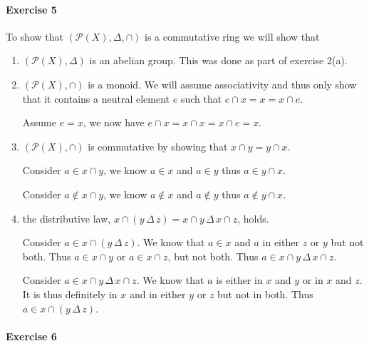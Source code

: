 \documentclass{article}
\newcommand{\Deltaop}{\, \Delta\, }
\begin{document}
\pagebreak
\paragraph{Exercise 5}

To show that $(\mathcal{P}(X), \Delta, \cap)$ is a commutative ring we will show that
\begin{enumerate}
    \item $(\mathcal{P}(X), \Delta)$ is an abelian group. This was done as part of exercise 2(a).
    
    \item $(\mathcal{P}(X), \cap)$ is a monoid. We will assume associativity and thus only show that it contains a neutral element $e$ such that $e \cap x = x = x \cap e$.
    
    Assume $e = x$, we now have $e \cap x = x \cap x = x \cap e = x$.
    
    \item $(\mathcal{P}(X), \cap)$ is commutative by showing that $x \cap y = y \cap x$.
    
    Consider $a \in x \cap y$, we know $a \in x$ and $a \in y$ thus $a \in y \cap x$.
    
    Consider $a \not\in x \cap y$, we know $a \not\in x$ and $a \not\in y$ thus $a \not\in y \cap x$.
    
    \item the distributive law, $x \cap (y \Deltaop z) = x \cap y \Deltaop x \cap z$, holds.
    
    Consider $a \in x \cap (y \Deltaop z)$. We know that $a \in x$ and $a$ in either $z$ or $y$ but not both. Thus $a \in x \cap y$ or $a \in x \cap z$, but not both. Thus $a \in x \cap y \Deltaop x \cap z$.

    Consider $a \in x \cap y \Deltaop x \cap z$. We know that $a$ is either in $x$ and $y$ or in $x$ and $z$. It is thus definitely in $x$ and in either $y$ or $z$ but not in both. Thus $a \in x \cap (y \Deltaop z)$.
\end{enumerate}

\pagebreak
\paragraph{Exercise 6}
\end{document}
